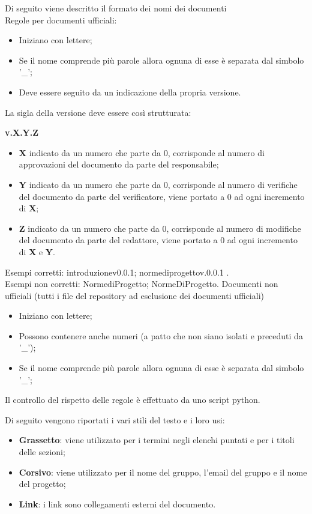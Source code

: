Di seguito viene descritto il formato dei nomi dei documenti\\
Regole per documenti ufficiali:
\begin{itemize}
\item Iniziano con lettere;
\item Se il nome comprende più parole allora ognuna di esse è separata dal simbolo '\_';
\item Deve essere seguito da un indicazione della propria versione.
\end {itemize}
La sigla della versione deve essere così strutturata:
\begin{center}
    \large{\textbf{v.X.Y.Z}}
\end{center}
\begin{itemize}
\item \textbf{X} indicato da un numero che parte da 0, corrisponde al numero di approvazioni del documento da parte del responsabile;
\item \textbf{Y} indicato da un numero che parte da 0, corrisponde al numero di verifiche del documento da parte del verificatore, viene portato a 0 ad ogni incremento di \textbf{X};
\item \textbf{Z} indicato da un numero che parte da 0, corrisponde al numero di modifiche del documento da parte del redattore, viene portato a 0 ad ogni incremento di \textbf{X} e \textbf{Y}.
\end {itemize}
Esempi corretti: introduzione\textunderscore v0.0.1; norme\textunderscore di\textunderscore progetto\textunderscore v.0.0.1 .\\
Esempi non corretti: Norme\textunderscore di\textunderscore Progetto; NormeDiProgetto.
Documenti non ufficiali (tutti i file del repository ad esclusione dei documenti ufficiali)
\begin{itemize}
    \item Iniziano con lettere;
    \item Possono contenere anche numeri (a patto che non siano isolati e preceduti da '\_');
    \item Se il nome comprende più parole allora ognuna di esse è separata dal simbolo '\_';
\end{itemize}
Il controllo del rispetto delle regole è effettuato da uno script python.

Di seguito vengono riportati i vari stili del testo e i loro usi:
\begin {itemize}
\item \textbf{Grassetto}: viene utilizzato per i termini negli elenchi puntati e per i titoli delle sezioni;
\item \textbf{Corsivo}: viene utilizzato per il nome del gruppo, l'email del gruppo e il nome del progetto;
\item \textbf{Link}: i link sono collegamenti esterni del documento.
\end {itemize}

